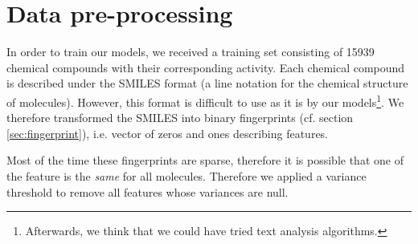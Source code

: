 \section{Data pre-processing}
In order to train our models, we received a training set consisting of \num{15939} chemical compounds with their corresponding activity. Each chemical compound is described under the SMILES format (a line notation for the chemical structure of molecules). However, this format is difficult to use as it is by our models\footnote{Afterwards, we think that we could have tried text analysis algorithms.}. We therefore transformed the SMILES into binary fingerprints (cf. section \ref{sec:fingerprint}), i.e. vector of zeros and ones describing features.

Most of the time these fingerprints are sparse, therefore it is possible that one of the feature is the \emph{same} for all molecules. Therefore we applied a variance threshold \cite{scikit-variance-threshold} to remove all features whose variances are null.
